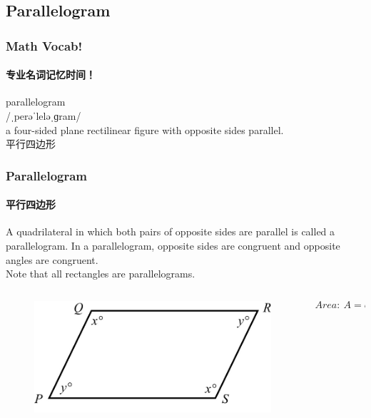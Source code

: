 \documentclass[
	11pt, %
	handout,
]{beamer}
\begin{document}

\subsection{Parallelogram}


\begin{frame}
	\frametitle{Math Vocab!} %
	\framesubtitle{专业名词记忆时间！}
	
	{\Huge parallelogram}\\
	{\LARGE /ˌperəˈleləˌɡram/\\
		\bigskip\bigskip
	a four-sided plane rectilinear figure with opposite sides parallel. \\ 
	平行四边形}

\end{frame}

	\begin{frame}
	\frametitle{Parallelogram} %
	\framesubtitle{平行四边形}
	\begin{definition}
		A quadrilateral in which both pairs of opposite sides are parallel
		is called a parallelogram. In a parallelogram, opposite sides are
		congruent and opposite angles are congruent. \\
		Note that all rectangles are parallelograms.
	\end{definition}

	\begin{columns}[t] 
		\begin{column}{0.5\textwidth} %
			\begin{figure}
				\includegraphics[width=\linewidth]{Parallelogram.jpg}
			\end{figure}
		\end{column}

		\begin{column}{0.5\textwidth} %
			\begin{equation*}
				Area:\ A = base \cdot height
			\end{equation*}
		\end{column}
	\end{columns}
\end{frame}
\end{document}
